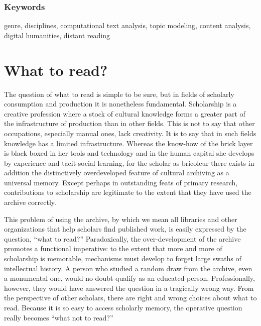 \documentclass[]{book}
\theoremstyle{definition}
\theoremstyle{definition}
\theoremstyle{definition}
\theoremstyle{remark}
\begin{document}
\hypertarget{keywords}{%
\subsubsection*{Keywords}\label{keywords}}


genre, disciplines, computational text analysis, topic
modeling, content analysis, digital humanities, distant reading

\hypertarget{what-to-read}{%
\section{What to read?}\label{what-to-read}}

The question of what to read is simple to be sure, but in fields of
scholarly consumption and production it is nonetheless fundamental.
Scholarship is a creative profession where a stock of cultural knowledge
forms a greater part of the infrastructure of production than in other
fields. This is not to say that other occupations, especially manual
ones, lack creativity. It is to say that in such fields knowledge has a
limited infrastructure. Whereas the know-how of the brick layer is black
boxed in her tools and technology and in the human capital she develops
by experience and tacit social learning, for the scholar as bricoleur
there exists in addition the distinctively overdeveloped feature of
cultural archiving as a universal memory. Except perhaps in outstanding
feats of primary research, contributions to scholarship are legitimate
to the extent that they have used the archive correctly.

This problem of using the archive, by which we mean all libraries and
other organizations that help scholars find published work, is easily
expressed by the question, ``what to read?'' Paradoxically, the
over-development of the archive promotes a functional imperative: to the
extent that more and more of scholarship is memorable, mechanisms must
develop to forget large swaths of intellectual history. A person who
studied a random draw from the archive, even a monumental one, would no
doubt qualify as an educated person. Professionally, however, they would
have answered the question in a tragically wrong way. From the
perspective of other scholars, there are right and wrong choices about
what to read. Because it is so easy to access scholarly memory, the
operative question really becomes ``what not to read?''
\end{document}
